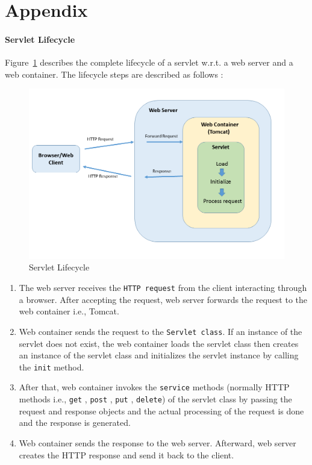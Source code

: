 \section{Appendix}\label{sec:Appendix}

\paragraph{Servlet Lifecycle}
Figure~\ref{fig:Server_Servlet} describes the complete lifecycle of a servlet w.r.t. a web server and a web container. The lifecycle steps are described as follows \cite{servlet}:

\begin{figure}[h]
	\centering
	\includegraphics[width=1\textwidth]{figures/Server_Servlet}
	\caption{Servlet Lifecycle}
	\label{fig:Server_Servlet}
\end{figure}

\begin{enumerate}
	\item {The web server receives the \texttt{HTTP request} from the client interacting through a browser. After accepting the request, web server forwards the request to the web container i.e., Tomcat.}
	\item {Web container sends the request to the \texttt{Servlet class}. If an instance of the servlet does not exist, the web container loads the servlet class then creates an instance of the servlet class and initializes the servlet instance by calling the \texttt{init} method.}
	\item {After that, web container invokes the \texttt{service} methods (normally HTTP methods i.e., \texttt{get} , \texttt{post} , \texttt{put} , \texttt{delete}) of the servlet class by passing the request and response objects and the actual processing of the request is done and the response is generated.}
	\item {Web container sends the response to the web server. Afterward, web server creates the HTTP response and send it back to the client.}
\end{enumerate}

